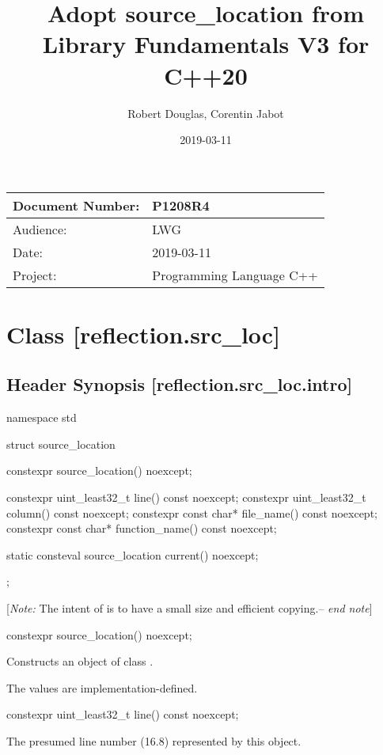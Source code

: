 \documentclass[a4paper,article]{article}
\title{Adopt source\_location from Library Fundamentals V3 for C++20}
\author{Robert Douglas, Corentin Jabot}
\date{2019-03-11}
\begin{document}
\maketitle
\begin{tabular}[t]{|l|l|}\hline
Document Number: &  P1208R4\\\hline
Audience: & LWG\\\hline
Date: &  2019-03-11 \\\hline
Project: & Programming Language C++\\\hline
\end{tabular}

\section{Class  [reflection.src_loc]}
\subsection{Header   Synopsis [reflection.src_loc.intro]}
\begin{codeblock}
namespace std {
  struct source_location {
    constexpr source_location() noexcept;

    constexpr uint_least32_t line() const noexcept;
    constexpr uint_least32_t column() const noexcept;
    constexpr const char* file_name() const noexcept;
    constexpr const char* function_name() const noexcept;

    static consteval source_location current() noexcept;
  };
}
\end{codeblock}
[\emph{Note:} The intent of  is to have a small size and efficient copying.-- \emph{end note}]

\begin{itemdecl}
constexpr source_location() noexcept;
\end{itemdecl}
\begin{itemdescr}
\pnum
\effects
Constructs an object of class .

\pnum
\note
The values are implementation-defined.
\end{itemdescr}

\begin{itemdecl}
constexpr uint_least32_t line() const noexcept;
\end{itemdecl}
\begin{itemdescr}
\pnum
\returns
The presumed line number (16.8) represented by this object.
\end{itemdescr}
\end{document}

